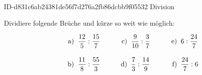 \begin{exercise}
      {ID-d831c6ab24381de56f7d276a2fb86dcbb9f05532}
      {Division}
  \ifproblem\problem\par
    Dividiere folgende Brüche und kürze so weit
    wie möglich:
    \newcommand{\no}[1]
    {%
      \vphantom{\Bigg(}%
      \makebox[3em][r]%
      {%
        #1)%
      }%
      \;\;&%
    }%
    \begin{align*}
      \no{a} \frac{12}{5}:\frac{15}{7} & \no{c} \frac{9}{10}:\frac{3}{7} & \no{e} 6:\frac{24}{7} \\
      \no{b} \frac{11}{8}:\frac{55}{3} & \no{d} \frac{7}{3}:\frac{14}{9} & \no{f} \frac{24}{7}:6
    \end{align*}
  \fi
\end{exercise}
